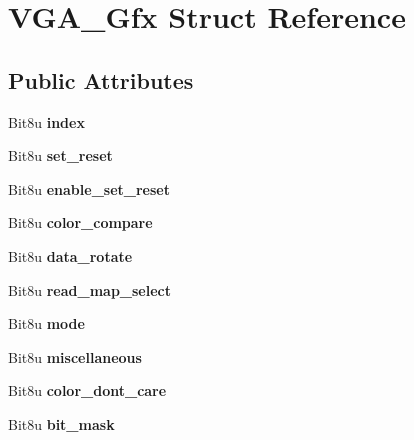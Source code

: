 \hypertarget{structVGA__Gfx}{\section{V\-G\-A\-\_\-\-Gfx Struct Reference}
\label{structVGA__Gfx}
}
\subsection*{Public Attributes}
\begin{DoxyCompactItemize}
\item 
\hypertarget{structVGA__Gfx_ac6ba1e8f874cbd01c1b8dd1ced17ab73}{Bit8u {\bfseries index}}\label{structVGA__Gfx_ac6ba1e8f874cbd01c1b8dd1ced17ab73}

\item 
\hypertarget{structVGA__Gfx_a86ab8c32603041da1fc669f12ae6a23a}{Bit8u {\bfseries set\-\_\-reset}}\label{structVGA__Gfx_a86ab8c32603041da1fc669f12ae6a23a}

\item 
\hypertarget{structVGA__Gfx_a0eddea9bf08f03f63d1523effe804318}{Bit8u {\bfseries enable\-\_\-set\-\_\-reset}}\label{structVGA__Gfx_a0eddea9bf08f03f63d1523effe804318}

\item 
\hypertarget{structVGA__Gfx_ab35967402394035b178af04bfd91be47}{Bit8u {\bfseries color\-\_\-compare}}\label{structVGA__Gfx_ab35967402394035b178af04bfd91be47}

\item 
\hypertarget{structVGA__Gfx_a573f1079591efc5f2a1ff2211d1a2eab}{Bit8u {\bfseries data\-\_\-rotate}}\label{structVGA__Gfx_a573f1079591efc5f2a1ff2211d1a2eab}

\item 
\hypertarget{structVGA__Gfx_ac7df0cc12ab290e2f033eb4102d5d032}{Bit8u {\bfseries read\-\_\-map\-\_\-select}}\label{structVGA__Gfx_ac7df0cc12ab290e2f033eb4102d5d032}

\item 
\hypertarget{structVGA__Gfx_ad51d267a6f609c179dc4546f96d9c23a}{Bit8u {\bfseries mode}}\label{structVGA__Gfx_ad51d267a6f609c179dc4546f96d9c23a}

\item 
\hypertarget{structVGA__Gfx_a89a2945ca8a6f88cf3dd6945edeb3756}{Bit8u {\bfseries miscellaneous}}\label{structVGA__Gfx_a89a2945ca8a6f88cf3dd6945edeb3756}

\item 
\hypertarget{structVGA__Gfx_af688514a9164017eba7ab86dc4a823f4}{Bit8u {\bfseries color\-\_\-dont\-\_\-care}}\label{structVGA__Gfx_af688514a9164017eba7ab86dc4a823f4}

\item 
\hypertarget{structVGA__Gfx_ac7eef63b68d6ec3ee37f72698323c212}{Bit8u {\bfseries bit\-\_\-mask}}\label{structVGA__Gfx_ac7eef63b68d6ec3ee37f72698323c212}

\end{DoxyCompactItemize}


